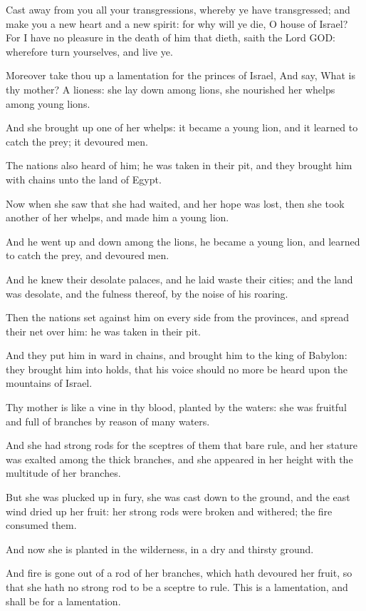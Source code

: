 \Verse Cast away from you all your transgressions, whereby ye have transgressed; and make you a new heart and a new spirit: for why will ye die, O house of Israel?  \Verse For I have no pleasure in the death of him that dieth, saith the Lord GOD: wherefore turn yourselves, and live ye.


\Chapter
\Verse Moreover take thou up a lamentation for the princes of Israel, \Verse And say, What is thy mother? A lioness: she lay down among lions, she nourished her whelps among young lions.

\Verse And she brought up one of her whelps: it became a young lion, and it learned to catch the prey; it devoured men.

\Verse The nations also heard of him; he was taken in their pit, and they brought him with chains unto the land of Egypt.

\Verse Now when she saw that she had waited, and her hope was lost, then she took another of her whelps, and made him a young lion.

\Verse And he went up and down among the lions, he became a young lion, and learned to catch the prey, and devoured men.

\Verse And he knew their desolate palaces, and he laid waste their cities; and the land was desolate, and the fulness thereof, by the noise of his roaring.

\Verse Then the nations set against him on every side from the provinces, and spread their net over him: he was taken in their pit.

\Verse And they put him in ward in chains, and brought him to the king of Babylon: they brought him into holds, that his voice should no more be heard upon the mountains of Israel.

\Verse Thy mother is like a vine in thy blood, planted by the waters: she was fruitful and full of branches by reason of many waters.

\Verse And she had strong rods for the sceptres of them that bare rule, and her stature was exalted among the thick branches, and she appeared in her height with the multitude of her branches.

\Verse But she was plucked up in fury, she was cast down to the ground, and the east wind dried up her fruit: her strong rods were broken and withered; the fire consumed them.

\Verse And now she is planted in the wilderness, in a dry and thirsty ground.

\Verse And fire is gone out of a rod of her branches, which hath devoured her fruit, so that she hath no strong rod to be a sceptre to rule. This is a lamentation, and shall be for a lamentation.


